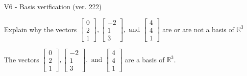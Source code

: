 \begin{exercise}
  \begin{exerciseTitle}V6 - Basis verification (ver. 222)\end{exerciseTitle}
  \begin{exerciseStatement}
    Explain why the vectors \(\left[\begin{array}{r}
0 \\
2 \\
1
\end{array}\right] , \left[\begin{array}{r}
-2 \\
1 \\
3
\end{array}\right] , \text{ and } \left[\begin{array}{r}
4 \\
4 \\
1
\end{array}\right]\) are or are not a basis of \(\mathbb{R}^3\)	


  \end{exerciseStatement}
  \begin{exerciseAnswer}
   The vectors \(\left[\begin{array}{r}
0 \\
2 \\
1
\end{array}\right] , \left[\begin{array}{r}
-2 \\
1 \\
3
\end{array}\right] , \text{ and } \left[\begin{array}{r}
4 \\
4 \\
1
\end{array}\right]\) 
  	 are  a basis of \(\mathbb{R}^3\).
  


  \end{exerciseAnswer}
\end{exercise}